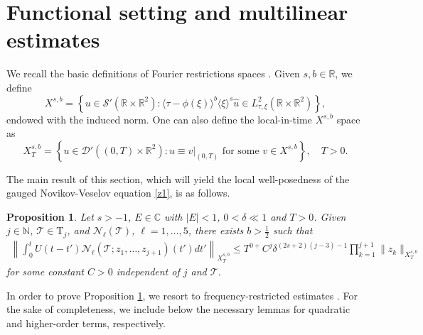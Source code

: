 \documentclass[a4paper,
11pt,  reqno]{amsart}
\newcommand{\jap}[1]{\langle #1 \rangle}
\newcommand{\5}{\textup{V}}
\newtheorem{proposition}[theorem]{Proposition}
\theoremstyle{remark}
\newcommand{\R}{\mathbb{R}}
\newcommand{\CC}{\mathbb{C}}
\newcommand{\TT}{\mathcal{T}}
\newcommand{\Tr}{\mathrm{T}}
\renewcommand{\l}{\ell}
\renewcommand{\S}{\mathcal{S}}
\newcommand{\N}{\mathbb{N}}
\numberwithin{equation}{section}
\numberwithin{theorem}{section}
\newcommand{\Ncal}{\mathcal{N}}
\begin{document}
\section{Functional setting and multilinear estimates}\label{sec:multi}


We recall the basic definitions of Fourier restrictions spaces \cite{bourg1, bourg2, tao_book}. Given $s,b\in\R$, we define
\begin{equation}
X^{s,b}=\left\{ u\in \S'(\R\times \R^2) : \jap{\tau-\phi(\xi)}^b\jap{\xi}^s  \widehat{u}\in L^2_{\tau,\xi}(\R\times \R^2)\right\},
\end{equation}
endowed with the induced norm. One can also define the local-in-time $X^{s,b}$ space as
\begin{equation}
X^{s,b}_T=\left\{ u\in \mathcal{D}'((0,T)\times \R^2) : u\equiv v\big|_{(0,T)}\mbox{ for some }v\in X^{s,b}  \right\},\quad T>0.
\end{equation}

The main result of this section, which will yield the local well-posedness of the gauged Novikov-Veselov equation \eqref{z1}, is as follows.
\begin{proposition}\label{prop:bourgL2}
Let $s>-1$, $E\in\CC$ with $|E|<1$, $0<\delta\ll 1$ and $T>0$. Given $j \in\N$, $\TT \in \Tr_j$, and $\Ncal_\l(\TT)$, $\l=1,\dots,5$, there exists $b>\frac12$ such that
	\begin{align}\label{eq:bourg_bi_l2}
		\left\|\int_0^t U(t-t') \Ncal_\l(\TT; z_1,\dots, z_{j+1})(t') dt'  \right\|_{X^{s,b}_T}  \le T^{0+} C^j\delta^{(2s+2)(j-3)-1}\prod_{k=1}^{j+1}\|z_k\|_{X^{s,b}_T}
	\end{align}
    for some constant $C>0$ independent of $j$ and $\TT$.
\end{proposition}


In order to prove Proposition \ref{prop:bourgL2}, we resort to frequency-restricted estimates \cite{COS}. For the sake of completeness, we include below the necessary lemmas for quadratic and higher-order terms, respectively.
\end{document}
